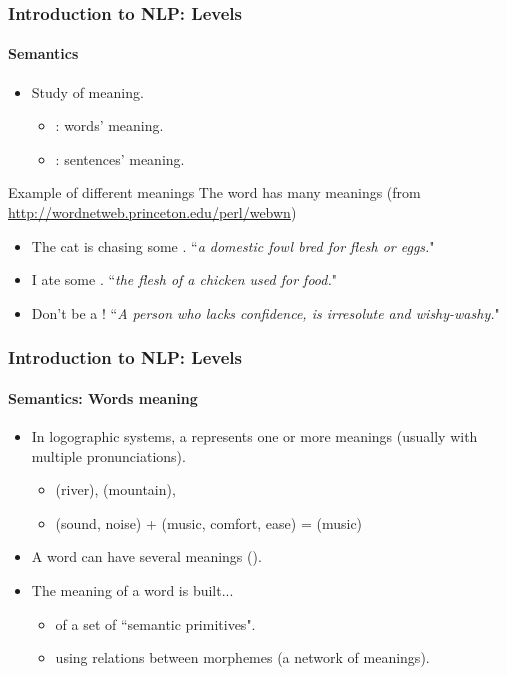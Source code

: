 \documentclass[xcolor=table]{beamer}
\begin{document}
\begin{frame}
\frametitle{Introduction to NLP: Levels}
\framesubtitle{Semantics}

\begin{itemize}
	\item Study of meaning.
	\begin{itemize}
		\item {}: words' meaning.
		\item {}: sentences' meaning.
	\end{itemize}
\end{itemize}

\begin{exampleblock}{Example of different meanings}
	The word  has many meanings (from \url{http://wordnetweb.princeton.edu/perl/webwn})
	\begin{itemize}
		\item The cat is chasing some . ``\textit{a domestic fowl bred for flesh or eggs.}"
		\item I ate some . ``\textit{the flesh of a chicken used for food.}"
		\item Don't be a ! ``\textit{A person who lacks confidence, is irresolute and wishy-washy.}"
	\end{itemize}
	
\end{exampleblock}

\end{frame}

\begin{frame}
\frametitle{Introduction to NLP: Levels}
\framesubtitle{Semantics: Words meaning}

\begin{itemize}
	\item In logographic systems, a  represents one or more meanings (usually with multiple pronunciations).
	
	\begin{CJK}{UTF8}{min}
		\begin{itemize}
		\item {} (river),  (mountain), 
		
		\item {} (sound, noise) +  (music, comfort, ease) =  (music)
		\end{itemize}
	\end{CJK}

	\item A word can have several meanings ().
	\item The meaning of a word is built...
	\begin{itemize}
		\item of a set of ``semantic primitives".
		\item using relations between morphemes (a network of meanings).
	\end{itemize}
\end{itemize}

\end{frame}
\end{document}

